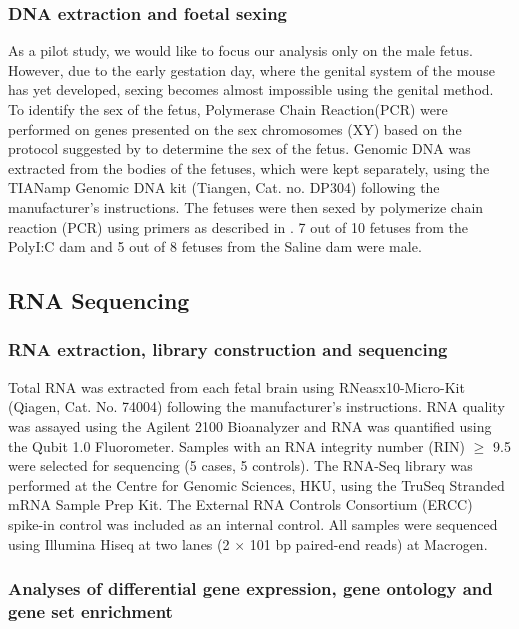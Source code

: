 \subsubsection{DNA extraction and foetal sexing}
As a pilot study, we would like to focus our analysis only on the male fetus.
However, due to the early gestation day, where the genital system of the mouse has yet developed, sexing becomes almost impossible using the genital method.
To identify the sex of the fetus, Polymerase Chain Reaction(PCR) were performed on genes presented on the sex chromosomes (XY) based on the protocol suggested by \citet{Clapcote2005} to determine the sex of the fetus. 
Genomic DNA was extracted from the bodies of the fetuses, which were kept separately, using the TIANamp Genomic DNA kit (Tiangen, Cat. no. DP304) following the manufacturer's instructions.
The fetuses were then sexed by polymerize chain reaction (PCR) using primers as described in \citet{Clapcote2005}.
 7 out of 10 fetuses from the PolyI:C dam and 5 out of 8 fetuses from the Saline dam were male.


\subsection{RNA Sequencing}
\subsubsection{RNA extraction, library construction and sequencing}
Total RNA was extracted from each fetal brain using RNeasx10-Micro-Kit (Qiagen, Cat. No. 74004) following the manufacturer’s instructions. 
RNA quality was assayed using the Agilent 2100 Bioanalyzer and RNA was quantified using the Qubit 1.0 Fluorometer. 
Samples with an RNA integrity number (RIN) $\ge$ 9.5 were selected for sequencing (5 cases, 5 controls). 
The RNA-Seq library was performed at the Centre for Genomic Sciences, HKU, using the TruSeq Stranded mRNA Sample Prep Kit. 
The External RNA Controls Consortium (ERCC) spike-in control\cite{Jiang2011} was included as an internal control. 
All samples were sequenced using Illumina Hiseq at two lanes (2 $\times$ 101 bp paired-end reads) at Macrogen.

\subsubsection{Analyses of differential gene expression, gene ontology and gene set enrichment}


